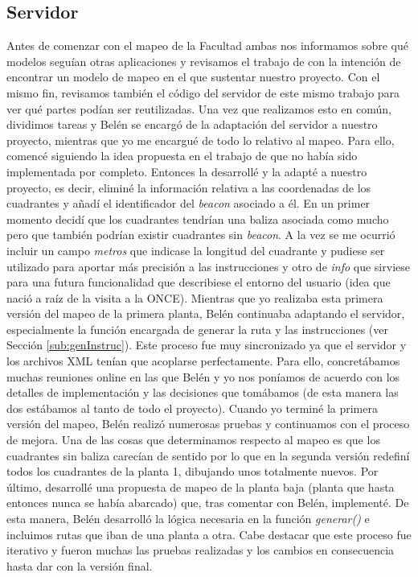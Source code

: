 \subsection{Servidor}
Antes de comenzar con el mapeo de la Facultad ambas nos informamos sobre qué modelos seguían otras aplicaciones y revisamos el trabajo de \cite{TFGguia} con la intención de encontrar un modelo de mapeo en el que sustentar nuestro proyecto. Con el mismo fin, revisamos también el código del servidor de este mismo trabajo para ver qué partes podían ser reutilizadas. Una vez que realizamos esto en común, dividimos tareas y Belén se encargó de la adaptación del servidor a nuestro proyecto, mientras que yo me encargué de todo lo relativo al mapeo. Para ello, comencé siguiendo la idea propuesta en el trabajo de \cite{TFGguia} que no había sido implementada por completo. Entonces la desarrollé y la adapté a nuestro proyecto, es decir, eliminé la información relativa a las coordenadas de los cuadrantes y añadí el identificador del \textit{beacon} asociado a él. En un primer momento decidí que los cuadrantes tendrían una baliza asociada como mucho pero que también podrían existir cuadrantes sin \textit{beacon}. A la vez se me ocurrió incluir un campo \textit{metros} que indicase la longitud del cuadrante y pudiese ser utilizado para aportar más precisión a las instrucciones y otro de \textit{info} que sirviese para una futura funcionalidad que describiese el entorno del usuario (idea que nació a raíz de la visita a la ONCE). Mientras que yo realizaba esta primera versión del mapeo de la primera planta, Belén continuaba adaptando el servidor, especialmente la función encargada de generar la ruta y las instrucciones (ver Sección \ref{sub:genInstruc}). Este proceso fue muy sincronizado ya que el servidor y los archivos XML tenían que acoplarse perfectamente. Para ello, concretábamos muchas reuniones online en las que Belén y yo nos poníamos de acuerdo con los detalles de implementación y las decisiones que tomábamos (de esta manera las dos estábamos al tanto de todo el proyecto). Cuando yo terminé la primera versión del mapeo, Belén realizó numerosas pruebas y continuamos con el proceso de mejora. Una de las cosas que determinamos respecto al mapeo es que los cuadrantes sin baliza carecían de sentido por lo que en la segunda versión redefiní todos los cuadrantes de la planta 1, dibujando unos totalmente nuevos. Por último, desarrollé una propuesta de mapeo de la planta baja (planta que hasta entonces nunca se había abarcado) que, tras comentar con Belén, implementé. De esta manera, Belén desarrolló la lógica necesaria en la función \textit{generar()} e incluimos rutas que iban de una planta a otra. Cabe destacar que este proceso fue iterativo y fueron muchas las pruebas realizadas y los cambios en consecuencia hasta dar con la versión final.

